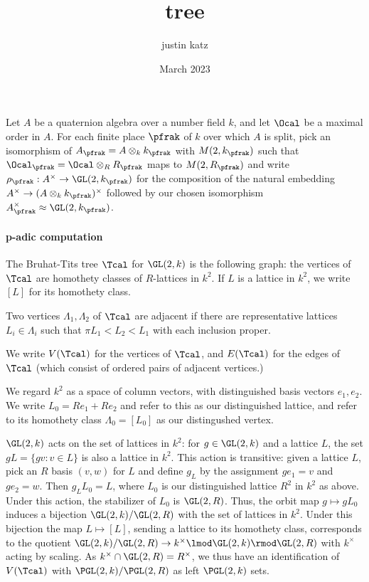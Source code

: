 \documentclass[draft]{article}
\title{tree}
\author{justin katz}
\date{March 2023}
\begin{document}
Let $A$ be a quaternion algebra over a number field $k$, and let $\Ocal$ be a maximal order in $A$. For each finite place $\pfrak$ of $k$ over which $A$ is split, pick an isomorphism of $A_\pfrak =A\otimes_k k_\pfrak$ with $M(2,k_\pfrak)$ such that $\Ocal_\pfrak = \Ocal \otimes_R R_\pfrak$ maps to $M(2,R_\pfrak)$ and write $\rho_\pfrak:A^\times \to \GL(2,k_\pfrak)$ for the composition of the natural embedding $A^\times \to (A\otimes_k k_\pfrak)^\times$ followed by our chosen isomorphism $A_\pfrak^\times \approx \GL(2,k_\pfrak)$. 

\paragraph*{p-adic computation}
\begin{definition}
The Bruhat-Tits tree $\Tcal$ for $\GL(2,k)$ is the following graph: the vertices of $\Tcal$ are homothety classes of $R$-lattices in $k^2$.
If $L$ is a lattice in $k^2$, we write $[L]$ for its homothety class. 

Two vertices $\Lambda_1,\Lambda_2 $ of $\Tcal$ are adjacent if there are representative lattices $L_i \in \Lambda_i$ such that $\pi L_1 < L_2 < L_1$ with each inclusion proper.

We write $V(\Tcal)$ for the vertices of $\Tcal$, and $E(\Tcal)$ for the edges of $\Tcal$ (which consist of ordered pairs of adjacent vertices.)
\end{definition}

We regard $k^2$ as a space of column vectors, with distinguished basis vectors $e_1,e_2$. We write $L_0 = Re_1+Re_2$ and refer to this as our distinguished lattice, and refer to its homothety class $\Lambda_0 = [L_0]$ as our distingushed vertex.  
 
$\GL(2,k)$ acts on the set of lattices in $k^2$: for $g\in \GL(2,k)$ and a lattice $L$, the set $gL = \{ g v : v \in L\}$ is also a lattice in $k^2$. This action is transitive: given a lattice $L$, pick an $R$ basis $(v,w)$ for $L$ and define $g_L$ by the assignment $ge_1 = v$ and $ge_2 = w$. Then $g_L L_0 =L$, where $L_0$ is our distinguished lattice $R^2$ in $k^2$ as above. Under this action, the stabilizer of $L_0$ is $\GL(2,R)$. Thus, the orbit map $g \mapsto gL_0$ induces a bijection $\GL(2,k)/ \GL(2,R)$ with the set of lattices in $k^2$. Under this bijection the map $L\mapsto [L]$, sending a lattice to its homothety class, corresponds to the quotient $\GL(2,k) / \GL(2,R) \to k^\times \lmod \GL(2,k) \rmod \GL(2,R)$ with $k^\times$ acting by scaling. As $k^\times \cap \GL(2,R) = R^\times$, we thus have an identification of $V(\Tcal)$ with $\PGL(2,k)/\PGL(2,R)$ as left $\PGL(2,k)$ sets.  
\end{document}
